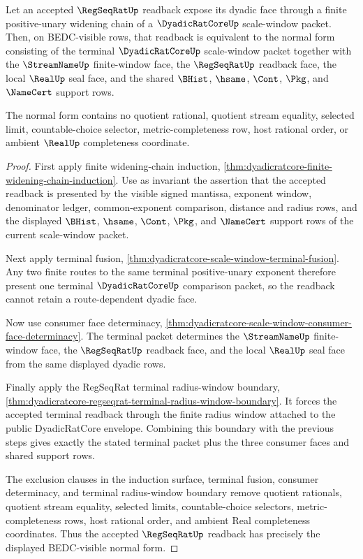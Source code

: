 \begin{theorem}
\label{thm:dyadicratcore-regseqrat-radius-window-normal-form}
Let an accepted $\RegSeqRatUp$ readback expose its dyadic face through a finite positive-unary widening chain of a $\DyadicRatCoreUp$ scale-window packet. Then, on BEDC-visible rows, that readback is equivalent to the normal form consisting of the terminal $\DyadicRatCoreUp$ scale-window packet together with the $\StreamNameUp$ finite-window face, the $\RegSeqRatUp$ readback face, the local $\RealUp$ seal face, and the shared $\BHist$, $\hsame$, $\Cont$, $\Pkg$, and $\NameCert$ support rows.

The normal form contains no quotient rational, quotient stream equality, selected limit, countable-choice selector, metric-completeness row, host rational order, or ambient $\RealUp$ completeness coordinate.
\end{theorem}
\begin{proof}
First apply finite widening-chain induction, \autoref{thm:dyadicratcore-finite-widening-chain-induction}. Use as invariant the assertion that the accepted readback is presented by the visible signed mantissa, exponent window, denominator ledger, common-exponent comparison, distance and radius rows, and the displayed $\BHist$, $\hsame$, $\Cont$, $\Pkg$, and $\NameCert$ support rows of the current scale-window packet.

Next apply terminal fusion, \autoref{thm:dyadicratcore-scale-window-terminal-fusion}. Any two finite routes to the same terminal positive-unary exponent therefore present one terminal $\DyadicRatCoreUp$ comparison packet, so the readback cannot retain a route-dependent dyadic face.

Now use consumer face determinacy, \autoref{thm:dyadicratcore-scale-window-consumer-face-determinacy}. The terminal packet determines the $\StreamNameUp$ finite-window face, the $\RegSeqRatUp$ readback face, and the local $\RealUp$ seal face from the same displayed dyadic rows.

Finally apply the RegSeqRat terminal radius-window boundary, \autoref{thm:dyadicratcore-regseqrat-terminal-radius-window-boundary}. It forces the accepted terminal readback through the finite radius window attached to the public DyadicRatCore envelope. Combining this boundary with the previous steps gives exactly the stated terminal packet plus the three consumer faces and shared support rows.

The exclusion clauses in the induction surface, terminal fusion, consumer determinacy, and terminal radius-window boundary remove quotient rationals, quotient stream equality, selected limits, countable-choice selectors, metric-completeness rows, host rational order, and ambient Real completeness coordinates. Thus the accepted $\RegSeqRatUp$ readback has precisely the displayed BEDC-visible normal form.
\end{proof}

